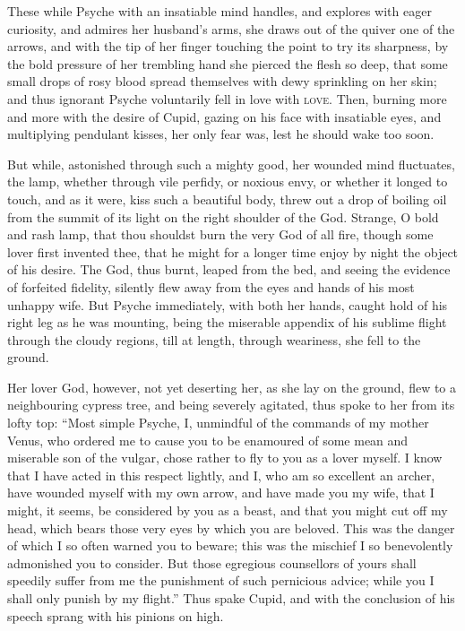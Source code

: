 \documentclass[12pt]{article}
\begin{document}
These while Psyche with an insatiable mind handles, and explores with eager
curiosity, and admires her husband's arms, she draws out of the quiver one of
the arrows, and with the tip of her finger touching the point to try its
sharpness, by the bold pressure of her trembling hand she pierced the flesh so
deep, that some small drops of rosy blood spread themselves with dewy
sprinkling on her skin; and thus ignorant Psyche voluntarily fell in love with
\textsc{love}. Then, burning more and more with the desire of Cupid, gazing on
his face with insatiable eyes, and multiplying pendulant kisses, her only fear
was, lest he should wake too soon.

But while, astonished through such a mighty good, her wounded mind fluctuates,
the lamp, whether through vile perfidy, or noxious envy, or whether it longed
to touch, and as it were, kiss such a beautiful body, threw out a drop of
boiling oil from the summit of its light on the right shoulder of the God.
Strange, O bold and rash lamp, that thou shouldst burn the very God of all
fire, though some lover first invented thee, that he might for a longer time
enjoy by night the object of his desire. The God, thus burnt, leaped from the
bed, and seeing the evidence of forfeited fidelity, silently flew away from
the eyes and hands of his most unhappy wife. But Psyche immediately, with both
her hands, caught hold of his right leg as he was mounting, being the miserable
appendix of his sublime flight through the cloudy regions, till at length,
through weariness, she fell to the ground.

Her lover God, however, not yet deserting her, as she lay on the ground, flew
to a neighbouring cypress tree, and being severely agitated, thus spoke to her
from its lofty top: ``Most simple Psyche, I, unmindful of the commands of my
mother Venus, who ordered me to cause you to be enamoured of some mean and
miserable son of the vulgar, chose rather to fly to you as a lover myself. I
know that I have acted in this respect lightly, and I, who am so excellent an
archer, have wounded myself with my own arrow, and have made you my wife, that
I might, it seems, be considered by you as a beast, and that you might cut off
my head, which bears those very eyes by which you are beloved. This was the
danger of which I so often warned you to beware; this was the mischief I so
benevolently admonished you to consider. But those egregious counsellors of
yours shall speedily suffer from me the punishment of such pernicious advice;
while you I shall only punish by my flight.'' Thus spake Cupid, and with the
conclusion of his speech sprang with his pinions on high.
\end{document}
